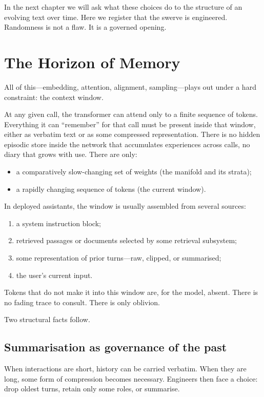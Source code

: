\documentclass[12pt,a4paper]{book}
\begin{document}
In the next chapter we will ask what these choices do to the structure of an evolving text over time. Here we register that the swerve is engineered. Randomness is not a flaw. It is a governed opening.

\section{The Horizon of Memory}

All of this---embedding, attention, alignment, sampling---plays out under a hard constraint: the context window.

At any given call, the transformer can attend only to a finite sequence of tokens. Everything it can ``remember'' for that call must be present inside that window, either as verbatim text or as some compressed representation. There is no hidden episodic store inside the network that accumulates experiences across calls, no diary that grows with use. There are only:

\begin{itemize}
  \item a comparatively slow-changing set of weights (the manifold and its strata);
  \item a rapidly changing sequence of tokens (the current window).
\end{itemize}

In deployed assistants, the window is usually assembled from several sources:

\begin{enumerate}
  \item a system instruction block;
  \item retrieved passages or documents selected by some retrieval subsystem;
  \item some representation of prior turns---raw, clipped, or summarised;
  \item the user's current input.
\end{enumerate}

Tokens that do not make it into this window are, for the model, absent. There is no fading trace to consult. There is only oblivion.

Two structural facts follow.

\subsection*{Summarisation as governance of the past}

When interactions are short, history can be carried verbatim. When they are long, some form of compression becomes necessary. Engineers then face a choice: drop oldest turns, retain only some roles, or summarise.
\end{document}
